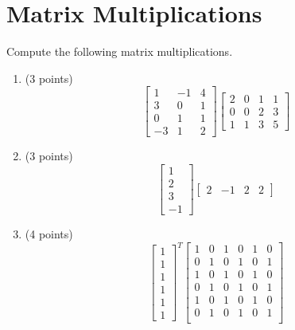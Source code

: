 \documentclass{article}
\theoremstyle{remark}
\begin{document}
\section{Matrix Multiplications}
Compute the following matrix multiplications.
\begin{enumerate}
\item (3 points)
  \begin{displaymath}
    \begin{bmatrix}
      1 & -1 & 4 \\
      3 & 0 & 1 \\
      0 & 1 & 1 \\
      -3 & 1 & 2
    \end{bmatrix}
    \begin{bmatrix}
      2 & 0 & 1 & 1 \\
      0 & 0 & 2 & 3 \\
      1 & 1 & 3 & 5
    \end{bmatrix}
  \end{displaymath}
\item (3 points)
  \begin{displaymath}
    \begin{bmatrix}
      1 \\ 2 \\ 3 \\ -1
    \end{bmatrix}
    \begin{bmatrix}
      2 & -1 & 2 & 2
    \end{bmatrix}
  \end{displaymath}
\item (4 points)
  \begin{displaymath}
    \begin{bmatrix}
      1 \\ 1 \\ 1 \\ 1 \\ 1 \\ 1
    \end{bmatrix}^T
    \begin{bmatrix}
      1 & 0 & 1 & 0 & 1 & 0 \\
      0 & 1 & 0 & 1 & 0 & 1 \\
      1 & 0 & 1 & 0 & 1 & 0 \\
      0 & 1 & 0 & 1 & 0 & 1 \\
      1 & 0 & 1 & 0 & 1 & 0 \\
      0 & 1 & 0 & 1 & 0 & 1 \\
    \end{bmatrix}

\end{displaymath}
\end{enumerate}
\end{document}
